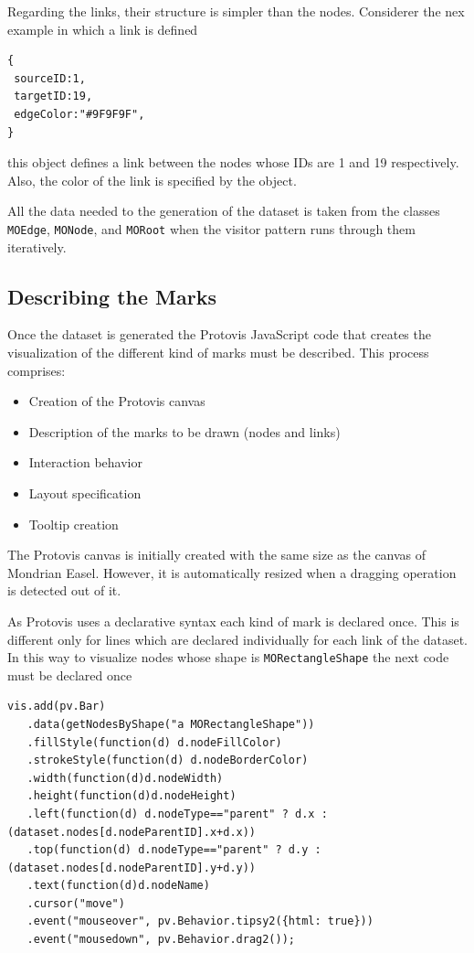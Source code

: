 \documentclass[preprint,10pt]{sigplanconf}
\newcommand{\ct}{\lstinline[backgroundcolor=\color{white},basicstyle=\footnotesize\ttfamily]}
\newcommand{\sv}[1]{\nb{Santiago}{orange}{#1}}
\begin{document}
Regarding the links, their structure is simpler than the nodes. Considerer the nex example in which a link is defined
\begin{lstlisting} 
{
 sourceID:1, 
 targetID:19,
 edgeColor:"#9F9F9F",
}
\end{lstlisting}
this object defines a link between the nodes whose IDs are 1 and 19 respectively. Also, the color of the link is specified by the object. 

All the data needed to the generation of the dataset is taken from the classes \ct{MOEdge}, \ct{MONode}, and \ct{MORoot} when the visitor pattern runs through them iteratively.


\subsection{Describing the Marks}

Once the dataset is generated the Protovis JavaScript code that creates the visualization of the different kind of marks must be described. This process comprises: 
\begin{itemize}
\item Creation of the Protovis canvas
\item Description of the marks to be drawn (nodes and links)
\item Interaction behavior
\item Layout specification
\item Tooltip creation
\end{itemize}

The Protovis canvas is initially created with the same size as the canvas of Mondrian Easel. However, it is automatically resized when a dragging operation is detected out of it.

As Protovis uses a declarative syntax each kind of mark is declared once. This is different only for lines which are declared individually for each link of the dataset. In this way to visualize nodes whose shape is \ct{MORectangleShape} the next code must be declared once
\begin{lstlisting} 
vis.add(pv.Bar)
   .data(getNodesByShape("a MORectangleShape"))
   .fillStyle(function(d) d.nodeFillColor)
   .strokeStyle(function(d) d.nodeBorderColor)
   .width(function(d)d.nodeWidth)
   .height(function(d)d.nodeHeight)
   .left(function(d) d.nodeType=="parent" ? d.x : (dataset.nodes[d.nodeParentID].x+d.x))
   .top(function(d) d.nodeType=="parent" ? d.y : (dataset.nodes[d.nodeParentID].y+d.y))
   .text(function(d)d.nodeName)
   .cursor("move")
   .event("mouseover", pv.Behavior.tipsy2({html: true}))
   .event("mousedown", pv.Behavior.drag2());
\end{lstlisting}
\end{document}
